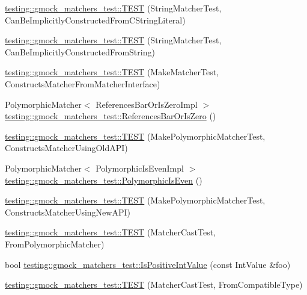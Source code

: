 \begin{DoxyCompactItemize}
\item 
\mbox{\hyperlink{namespacetesting_1_1gmock__matchers__test_a17fb479932a88dc4e334327c5e12c8d6}{testing\+::gmock\+\_\+matchers\+\_\+test\+::\+T\+E\+ST}} (String\+Matcher\+Test, Can\+Be\+Implicitly\+Constructed\+From\+C\+String\+Literal)
\item 
\mbox{\hyperlink{namespacetesting_1_1gmock__matchers__test_a6786eca17f1fc4d6250470cc21ec79f1}{testing\+::gmock\+\_\+matchers\+\_\+test\+::\+T\+E\+ST}} (String\+Matcher\+Test, Can\+Be\+Implicitly\+Constructed\+From\+String)
\item 
\mbox{\hyperlink{namespacetesting_1_1gmock__matchers__test_ae433e93168010d7316b40ef4a5088d09}{testing\+::gmock\+\_\+matchers\+\_\+test\+::\+T\+E\+ST}} (Make\+Matcher\+Test, Constructs\+Matcher\+From\+Matcher\+Interface)
\item 
Polymorphic\+Matcher$<$ References\+Bar\+Or\+Is\+Zero\+Impl $>$ \mbox{\hyperlink{namespacetesting_1_1gmock__matchers__test_ac07376a5dff45a905b7eb96e621ce3aa}{testing\+::gmock\+\_\+matchers\+\_\+test\+::\+References\+Bar\+Or\+Is\+Zero}} ()
\item 
\mbox{\hyperlink{namespacetesting_1_1gmock__matchers__test_aad0604e47fea147ae133d134b4606a26}{testing\+::gmock\+\_\+matchers\+\_\+test\+::\+T\+E\+ST}} (Make\+Polymorphic\+Matcher\+Test, Constructs\+Matcher\+Using\+Old\+A\+PI)
\item 
Polymorphic\+Matcher$<$ Polymorphic\+Is\+Even\+Impl $>$ \mbox{\hyperlink{namespacetesting_1_1gmock__matchers__test_a8a0035a0de2d219d89ff7070762ece72}{testing\+::gmock\+\_\+matchers\+\_\+test\+::\+Polymorphic\+Is\+Even}} ()
\item 
\mbox{\hyperlink{namespacetesting_1_1gmock__matchers__test_a619d872aa86419c5093327f64c466df3}{testing\+::gmock\+\_\+matchers\+\_\+test\+::\+T\+E\+ST}} (Make\+Polymorphic\+Matcher\+Test, Constructs\+Matcher\+Using\+New\+A\+PI)
\item 
\mbox{\hyperlink{namespacetesting_1_1gmock__matchers__test_afffaa6f2c436edb7c46e7a16ed2de825}{testing\+::gmock\+\_\+matchers\+\_\+test\+::\+T\+E\+ST}} (Matcher\+Cast\+Test, From\+Polymorphic\+Matcher)
\item 
bool \mbox{\hyperlink{namespacetesting_1_1gmock__matchers__test_a68565741c989968637db5a9e10e55020}{testing\+::gmock\+\_\+matchers\+\_\+test\+::\+Is\+Positive\+Int\+Value}} (const Int\+Value \&foo)
\item 
\mbox{\hyperlink{namespacetesting_1_1gmock__matchers__test_aa7a28536a6c59d56bbbbdb4fa5ba9e4d}{testing\+::gmock\+\_\+matchers\+\_\+test\+::\+T\+E\+ST}} (Matcher\+Cast\+Test, From\+Compatible\+Type)

\end{DoxyCompactItemize}
